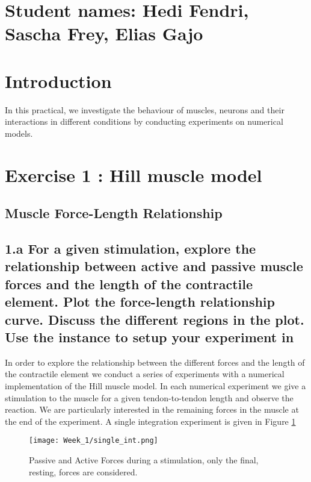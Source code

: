 \documentclass[11pt]{article}
\begin{document}
\pagestyle{fancy}
 

\section*{Student names: Hedi Fendri, Sascha Frey, Elias Gajo}
\section*{Introduction}
In this practical, we investigate the behaviour of muscles, neurons and their interactions in different conditions by conducting experiments on numerical models. 


\section*{Exercise 1 : Hill muscle model}
\label{sec:question-2}

\subsection*{Muscle Force-Length Relationship}
\label{sec:muscle-force-length}

\subsection*{1.a For a given stimulation, explore the relationship
  between active and passive muscle forces and the length of the
  contractile element.  Plot the force-length relationship curve.
  Discuss the different regions in the plot. Use the
   instance
  to setup your experiment in }
  
In order to explore the relationship between the different forces and the length of the contractile element we conduct a series of experiments with a numerical implementation of the Hill muscle model. In each numerical experiment we give a stimulation to the muscle for a given tendon-to-tendon length and observe the reaction. We are particularly interested in the remaining forces in the muscle at the end of the experiment. A single integration experiment is given in Figure \ref{fig:experiment}

\begin{figure}[!h]
\centering
\texttt{[image: Week\_1/single\_int.png]}
\caption{Passive and Active Forces during a stimulation, only the final, resting, forces are considered.}
\label{fig:experiment}
\end{figure}
\end{document}
